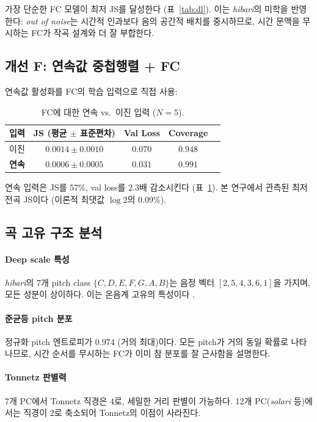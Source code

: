 \documentclass[conference,10pt,a4paper]{IEEEtran}
\begin{document}
가장 단순한 FC 모델이 최저 JS를 달성한다 (표~\ref{tab:dl}).
이는 \emph{hibari}의 미학을 반영한다: \emph{out of noise}는
시간적 인과보다 음의 공간적 배치를 중시하므로, 시간 문맥을
무시하는 FC가 작곡 설계와 더 잘 부합한다.

\subsection{개선 F: 연속값 중첩행렬 + FC}
\label{subsec:improvF}

연속값 활성화를 FC의 학습 입력으로 직접 사용:

\begin{table}[t]
\centering
\caption{FC에 대한 연속 vs.\ 이진 입력 ($N=5$).}
\label{tab:improvF}
\begin{tabular}{lcccc}
\toprule
입력 & JS (평균 $\pm$ 표준편차) & Val Loss & Coverage \\
\midrule
이진      & $0.0014 \pm 0.0010$ & $0.070$ & $0.948$ \\
\textbf{연속} & $\mathbf{0.0006 \pm 0.0005}$ & $\mathbf{0.031}$ & $\mathbf{0.991}$ \\
\bottomrule
\end{tabular}
\end{table}

연속 입력은 JS를 $57\%$, val loss를 $2.3$배 감소시킨다
(표~\ref{tab:improvF}). 본 연구에서 관측된 최저 전곡 JS이다
(이론적 최댓값 $\log 2$의 $0.09\%$).

\subsection{곡 고유 구조 분석}
\label{subsec:structure}

\paragraph{Deep scale 특성}
\emph{hibari}의 7개 pitch class $\{C, D, E, F, G, A, B\}$는
음정 벡터 $[2,5,4,3,6,1]$을 가지며, 모든 성분이 상이하다.
이는 온음계 고유의 특성이다 \cite{gamer2003}.

\paragraph{준균등 pitch 분포}
\label{subsec:phase}
정규화 pitch 엔트로피가 $0.974$ (거의 최대)이다.
모든 pitch가 거의 동일 확률로 나타나므로, 시간 순서를 무시하는 FC가
이미 참 분포를 잘 근사함을 설명한다.

\paragraph{Tonnetz 판별력}
7개 PC에서 Tonnetz 직경은 $4$로, 세밀한 거리 판별이 가능하다.
12개 PC(\emph{solari} 등)에서는 직경이 $2$로 축소되어
Tonnetz의 이점이 사라진다.
\end{document}
